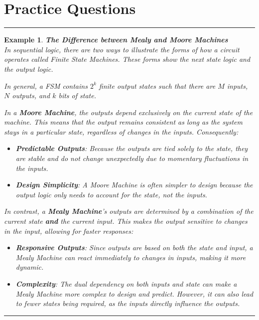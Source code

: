 \documentclass[12pt]{article}
\newtheorem{example}{Example}
\newenvironment{examp}
{
	\vspace{.5cm}
	\hrule
\begin{example}\upshape}
	{\hrule
		\vspace{0.5cm}
\end{example}}
\begin{document}
\section*{Practice Questions}
\begin{examp}
	\vspace{.5cm}
	\textbf{The Difference between Mealy and Moore Machines}\\
	In sequential logic, there are two ways to illustrate the forms of how a circuit
	operates called \textit{Finite State Machines}. These forms show the
	\textit{next state logic} and the \textit{output logic}.

	In general, a FSM contains \(2^k\) \textit{finite} output states such that
	there are \(M\) inputs, \(N\) outputs, and \(k\) bits of state.

	In a \textbf{Moore Machine}, the outputs depend exclusively on the \textit{current state} of the machine. This means that the output remains consistent as long as the system stays in a particular state, regardless of changes in the inputs. Consequently:
	\begin{itemize}
		\item \textbf{Predictable Outputs}: Because the outputs are tied solely to the state, they are stable and do not change unexpectedly due to momentary fluctuations in the inputs.
		\item \textbf{Design Simplicity}: A Moore Machine is often simpler to design because the output logic only needs to account for the state, not the inputs.
	\end{itemize}
	In contrast, a \textbf{Mealy Machine}’s outputs are determined by a combination of the \textit{current state} \textbf{and} the \textit{current input}. This makes the output sensitive to changes in the input, allowing for faster responses:

	\begin{itemize}
		\item \textbf{Responsive Outputs}: Since outputs are based on both the state and input, a Mealy Machine can react immediately to changes in inputs, making it more dynamic.

		\item \textbf{Complexity}: The dual dependency on both inputs and state can make a Mealy Machine more complex to design and predict. However, it can also lead to fewer states being required, as the inputs directly influence the outputs.
	\end{itemize}

\end{examp}
\end{document}
